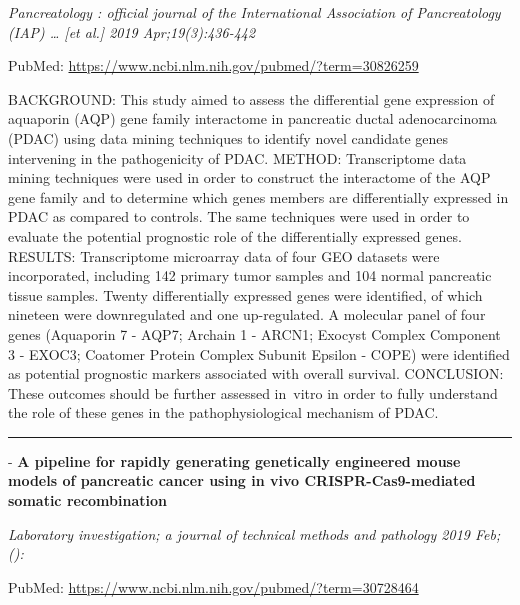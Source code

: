 \documentclass[]{article}
\begin{document}
\emph{Pancreatology : official journal of the International Association
of Pancreatology (IAP) \ldots{} {[}et al.{]} 2019 Apr;19(3):436-442}

PubMed: \url{https://www.ncbi.nlm.nih.gov/pubmed/?term=30826259}

BACKGROUND: This study aimed to assess the differential gene expression
of aquaporin (AQP) gene family interactome in pancreatic ductal
adenocarcinoma (PDAC) using data mining techniques to identify novel
candidate genes intervening in the pathogenicity of PDAC. METHOD:
Transcriptome data mining techniques were used in order to construct the
interactome of the AQP gene family and to determine which genes members
are differentially expressed in PDAC as compared to controls. The same
techniques were used in order to evaluate the potential prognostic role
of the differentially expressed genes. RESULTS: Transcriptome microarray
data of four GEO datasets were incorporated, including 142 primary tumor
samples and 104 normal pancreatic tissue samples. Twenty differentially
expressed genes were identified, of which nineteen were downregulated
and one up-regulated. A molecular panel of four genes (Aquaporin 7 -
AQP7; Archain 1 - ARCN1; Exocyst Complex Component 3 - EXOC3; Coatomer
Protein Complex Subunit Epsilon - COPE) were identified as potential
prognostic markers associated with overall survival. CONCLUSION: These
outcomes should be further assessed in~vitro in order to fully
understand the role of these genes in the pathophysiological mechanism
of PDAC.

{}

{}

\begin{center}\rule{0.5\linewidth}{\linethickness}\end{center}

 - \textbf{A pipeline for rapidly generating genetically engineered
mouse models of pancreatic cancer using in vivo CRISPR-Cas9-mediated
somatic recombination}

\emph{Laboratory investigation; a journal of technical methods and
pathology 2019 Feb;():}

PubMed: \url{https://www.ncbi.nlm.nih.gov/pubmed/?term=30728464}
\end{document}
